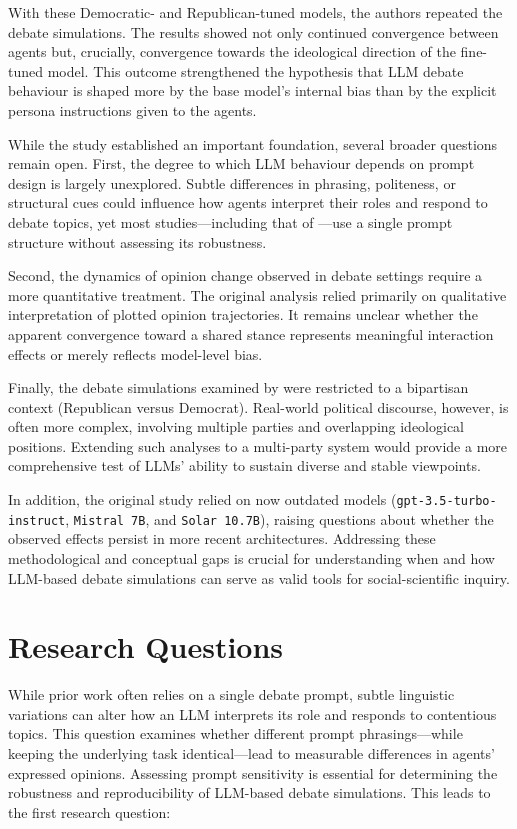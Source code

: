 With these Democratic- and Republican-tuned models, the authors repeated the debate simulations. The results showed not only continued convergence between agents but, crucially, convergence towards the ideological direction of the fine-tuned model. This outcome strengthened the hypothesis that LLM debate behaviour is shaped more by the base model’s internal bias than by the explicit persona instructions given to the agents.

While the study established an important foundation, several broader questions remain open. First, the degree to which LLM behaviour depends on prompt design is largely unexplored. Subtle differences in phrasing, politeness, or structural cues could influence how agents interpret their roles and respond to debate topics, yet most studies—including that of \citet{taubenfeld_systematic_2024}—use a single prompt structure without assessing its robustness.

Second, the dynamics of opinion change observed in debate settings require a more quantitative treatment. The original analysis relied primarily on qualitative interpretation of plotted opinion trajectories. It remains unclear whether the apparent convergence toward a shared stance represents meaningful interaction effects or merely reflects model-level bias.

Finally, the debate simulations examined by \citet{taubenfeld_systematic_2024} were restricted to a bipartisan context (Republican versus Democrat). Real-world political discourse, however, is often more complex, involving multiple parties and overlapping ideological positions. Extending such analyses to a multi-party system would provide a more comprehensive test of LLMs’ ability to sustain diverse and stable viewpoints.

In addition, the original study relied on now outdated models (\texttt{gpt-3.5-turbo-instruct}, \texttt{Mistral 7B}, and \texttt{Solar 10.7B}), raising questions about whether the observed effects persist in more recent architectures. Addressing these methodological and conceptual gaps is crucial for understanding when and how LLM-based debate simulations can serve as valid tools for social-scientific inquiry.


\section{Research Questions}
\label{sec:research_questions}
While prior work often relies on a single debate prompt, subtle linguistic variations can alter how an LLM interprets its role and responds to contentious topics. This question examines whether different prompt phrasings—while keeping the underlying task identical—lead to measurable differences in agents’ expressed opinions. Assessing prompt sensitivity is essential for determining the robustness and reproducibility of LLM-based debate simulations. This leads to the first research question:



